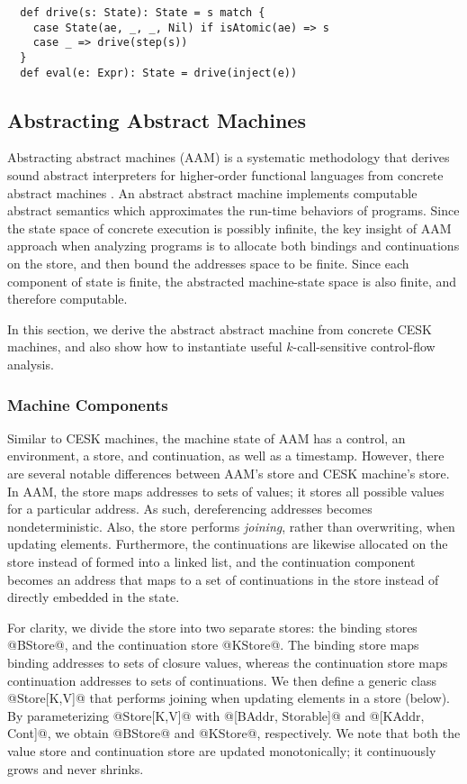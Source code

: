 \documentclass[acmsmall, review]{acmart}\settopmatter{}
\begin{document}
\begin{lstlisting}
  def drive(s: State): State = s match {
    case State(ae, _, _, Nil) if isAtomic(ae) => s
    case _ => drive(step(s))
  }
  def eval(e: Expr): State = drive(inject(e))
\end{lstlisting}

\subsection{Abstracting Abstract Machines} \label{aam}
Abstracting abstract machines (AAM) is a systematic methodology that derives sound
abstract interpreters for higher-order functional languages from concrete abstract 
machines \cite{van2012systematic, van2010abstracting}. An abstract abstract machine
implements computable abstract semantics which approximates the run-time behaviors of 
programs.
Since the state space of concrete execution is possibly infinite, the key insight of 
AAM approach when analyzing programs is to allocate both bindings and continuations 
on the store, and then bound the addresses space to be finite. Since each component
of state is finite, the abstracted machine-state space is also finite, and therefore
computable.

In this section, we derive the abstract abstract machine from concrete
CESK machines, and also show how to instantiate useful $k$-call-sensitive 
control-flow analysis.

\subsubsection{Machine Components}

Similar to CESK machines, the machine state of AAM has a control, an environment, a store,
and continuation, as well as a timestamp. However, there are several notable differences
between AAM's store and CESK machine's store. In AAM, the store maps addresses to sets of
values; it stores all possible values for a particular address. As such, dereferencing
addresses becomes nondeterministic. Also, the store performs \emph{joining}, rather than
overwriting, when updating elements. Furthermore, the continuations are likewise allocated
on the store instead of formed into a linked list, and the continuation component becomes
an address that maps to a set of continuations in the store instead of directly embedded
in the state.

For clarity, we divide the store into two separate stores: the binding stores @BStore@, and
the continuation store @KStore@.
The binding store maps binding addresses to sets of closure values, whereas the continuation
store maps continuation addresses to sets of continuations.
We then define a generic class @Store[K,V]@ that performs joining when updating elements
in a store (below). By parameterizing @Store[K,V]@ with @[BAddr, Storable]@ and
@[KAddr, Cont]@, we obtain @BStore@ and @KStore@, respectively.
We note that both the value store and continuation store are updated monotonically;
it continuously grows and never shrinks.
\end{document}
